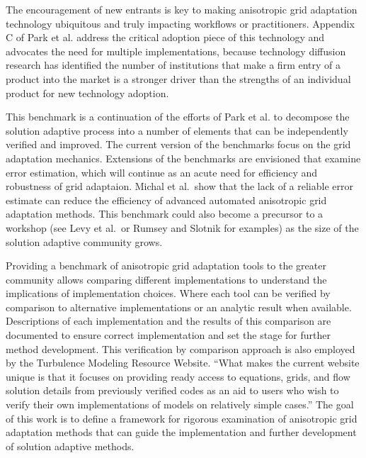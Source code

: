 \documentclass[3p,times,procedia,number]{elsarticle}
\begin{document}
The encouragement of new entrants is key to making
anisotropic grid adaptation technology ubiquitous and truly impacting
workflows or practitioners.
Appendix C of Park et al.\cite{park-unstruct-adapt-status-cfd2030}
address the critical adoption piece of this technology and
advocates the need for multiple implementations, 
because technology diffusion research has identified the
number of institutions that make a firm entry of a product
into the market is a stronger driver than the strengths of an individual
product for new technology
adoption.\cite{agarwal-bayus-market-evo-takeoff-innovation}

This benchmark is a continuation of the efforts of
Park et al.\cite{park-loseille-krakos-michal-adapt-decomposition}
to decompose the solution adaptive process into a number of
elements that can be independently verified and improved.
The current version of the benchmarks focus on the grid adaptation
mechanics.
Extensions of the benchmarks are envisioned that examine error
estimation, which will continue as an acute need for
efficiency and robustness of grid adaptaion.
Michal et al.\cite{michal-unstruct-adapt-epic-dpw6}~show that
the lack of a reliable error estimate can reduce the efficiency of advanced
automated anisotropic grid adaptation methods.
This benchmark could also become a
precursor to a workshop (see Levy et al.\cite{dpw5-summary}~or
Rumsey and Slotnik\cite{rumsey-slotnick-summary-highliftpw2} for examples)
as the size of the solution adaptive community grows.

Providing a benchmark
of anisotropic grid adaptation tools 
to the greater community
allows comparing different implementations
to understand the implications of implementation choices.
Where each tool can be verified
by comparison to alternative implementations or
an analytic result when available.
Descriptions of each implementation and the
results of this comparison are documented to ensure correct implementation
and set the stage for further method development.
This verification by comparison approach is also employed by the
Turbulence Modeling Resource Website.\cite{rumsey-smith-huang-turbmodels-description}
``What makes the current website unique is that it focuses on
providing ready access to equations, grids, and flow solution details
from previously verified codes as an aid to users
who wish to verify their own implementations of models on
relatively simple cases.''\cite{rumsey-smith-huang-turbmodels-description}
The goal of this work is to define a framework for
rigorous examination of anisotropic grid adaptation methods
that can guide the implementation and
further development of solution adaptive methods.
\end{document}
